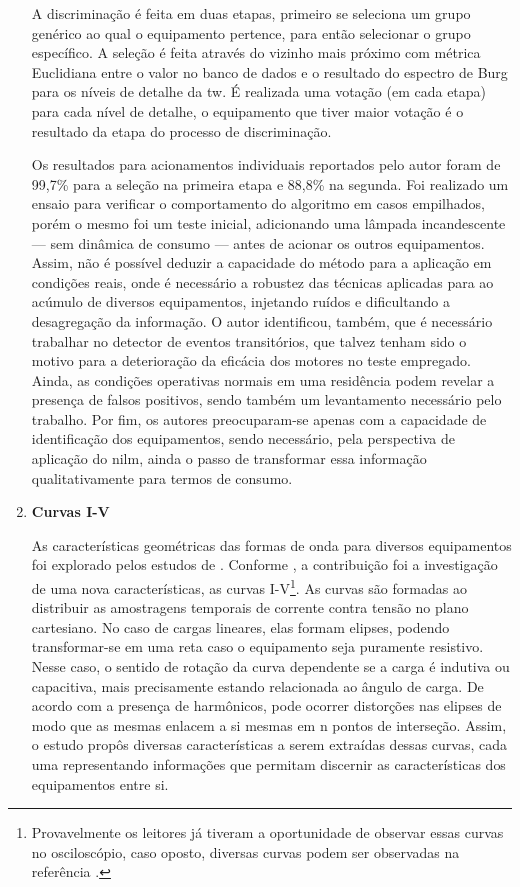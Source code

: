 \begin{enumerate}[label=\textbf{2.\arabic*},wide=\parindent]
A discriminação é feita em duas etapas, primeiro se seleciona um grupo
genérico ao qual o equipamento pertence, para então selecionar o grupo
específico. A seleção é feita através do vizinho mais próximo com
métrica Euclidiana entre o valor no banco de dados e o resultado do
espectro de Burg para os níveis de detalhe da \gls{tw}. É realizada
uma votação (em cada etapa) para cada nível de detalhe, o equipamento
que tiver maior votação é o resultado da etapa do processo de
discriminação.

Os resultados para acionamentos individuais reportados pelo autor
foram de 99,7\% para a seleção na primeira etapa e 88,8\% na segunda.
Foi realizado um ensaio para verificar o comportamento do algoritmo em
casos empilhados, porém o mesmo foi um teste inicial,
adicionando uma lâmpada incandescente --- sem dinâmica de consumo ---
antes de acionar os outros equipamentos.  Assim, não é possível
deduzir a capacidade do método para a aplicação em condições reais,
onde é necessário a robustez das técnicas aplicadas para ao
acúmulo de diversos equipamentos, injetando ruídos e dificultando
a desagregação da informação. O autor identificou, também, que é
necessário trabalhar no detector de eventos transitórios, que talvez
tenham sido o motivo para a deterioração da eficácia dos motores no
teste empregado. Ainda, as condições operativas normais em uma
residência podem revelar a presença de falsos positivos, sendo também
um levantamento necessário pelo trabalho. Por fim, os autores
preocuparam-se apenas com a capacidade de identificação dos equipamentos,
sendo necessário, pela perspectiva de aplicação do \gls{nilm}, ainda o
passo de transformar essa informação qualitativamente para termos de
consumo.

\item \textbf{Curvas I-V}
\label{nilm:curvas_iv}

As características geométricas das formas de onda para diversos
equipamentos foi explorado pelos estudos de
\citet{nilm_lee_2004_32,nilm_lam_2007_33}. Conforme
\cite{nilm_zeifman_review_2011}, a contribuição foi a investigação de
uma nova características, as curvas I-V\footnote{Provavelmente os
leitores já tiveram a oportunidade de observar essas curvas no
osciloscópio, caso oposto, diversas curvas podem ser observadas
na referência \cite{nilm_lam_2007_33}.}. As curvas são formadas ao
distribuir as amostragens temporais de corrente contra tensão no plano
cartesiano. No caso de cargas lineares, elas formam elipses, podendo
transformar-se em uma reta caso o equipamento seja puramente resistivo.
Nesse caso, o sentido de rotação da curva dependente se a carga é
indutiva ou capacitiva, mais precisamente estando relacionada ao
ângulo de carga. De acordo com a presença de harmônicos, pode ocorrer
distorções nas elipses de modo que as mesmas enlacem a si mesmas em n
pontos de interseção.  Assim, o estudo propôs diversas características
a serem extraídas dessas curvas, cada uma representando
informações que permitam discernir as características dos equipamentos
entre si.


\end{enumerate}
